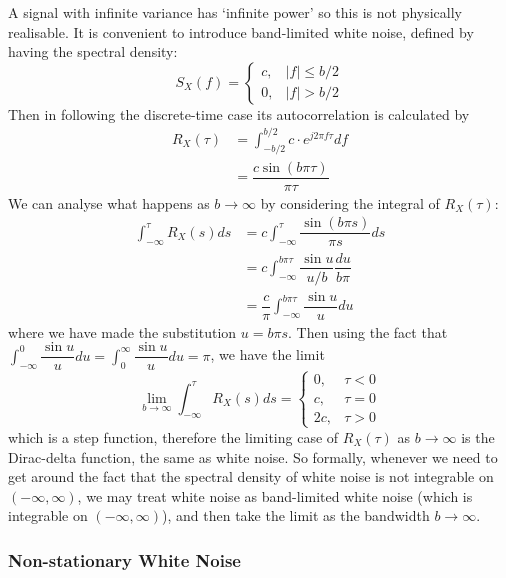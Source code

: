 \documentclass[11pt]{report} %
\begin{document}
A signal with infinite variance has `infinite power' so this is not physically realisable. It is convenient to introduce band-limited white noise, defined by having the spectral density:
\begin{equation}
S_{X}\left(f\right) = \begin{cases} c, & \left|f\right| \leq b/2 \\ 0, & \left|f\right| > b/2 \end{cases}
\end{equation}
Then in following the discrete-time case its autocorrelation is calculated by
\begin{align}
R_{X}\left(\tau\right) &= \int_{-b/2}^{b/2}c\cdot e^{j2\pi f\tau}df \\
&= \dfrac{c\sin\left(b\pi\tau\right)}{\pi\tau}
\end{align}
We can analyse what happens as $b \to \infty$ by considering the integral of $R_{X}\left(\tau\right)$:
\begin{align}
\int_{-\infty}^{\tau}R_{X}\left(s\right)ds &= c\int_{-\infty}^{\tau}\dfrac{\sin\left(b\pi s\right)}{\pi s}ds \\
&= c\int_{-\infty}^{b\pi\tau}\dfrac{\sin u}{u/b}\dfrac{du}{b\pi} \\
&= \dfrac{c}{\pi}\int_{-\infty}^{b\pi\tau}\dfrac{\sin u}{u}du
\end{align}
where we have made the substitution $u = b\pi s$. Then using the fact that $\int_{-\infty}^{0}\dfrac{\sin u}{u}du = \int_{0}^{\infty}\dfrac{\sin u}{u}du = \pi$, we have the limit
\begin{equation}
\lim_{b \to \infty}\int_{-\infty}^{\tau}R_{X}\left(s\right)ds = \begin{cases} 0, & \tau < 0 \\ c, & \tau = 0 \\ 2c, & \tau > 0 \end{cases}
\end{equation}
which is a step function, therefore the limiting case of $R_{X}\left(\tau\right)$ as $b \to \infty$ is the Dirac-delta function, the same as white noise. So formally, whenever we need to get around the fact that the spectral density of white noise is not integrable on $\left(-\infty, \infty\right)$, we may treat white noise as band-limited white noise (which is integrable on $\left(-\infty, \infty\right)$), and then take the limit as the bandwidth $b \to \infty$.

\subsubsection{Non-stationary White Noise}
\end{document}

